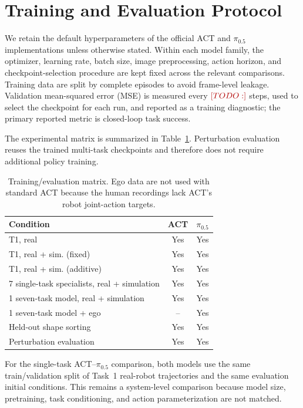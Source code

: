\documentclass[10pt,conference]{IEEEtran}
\newcommand{\TODO}[1]{\textcolor{red!70!black}{[TODO: #1]}}
\begin{document}
\section{Training and Evaluation Protocol}
\label{sec:protocol}

We retain the default hyperparameters of the official ACT and $\pi_{0.5}$
implementations unless otherwise stated. Within each model family, the
optimizer, learning rate, batch size, image preprocessing, action horizon, and
checkpoint-selection procedure are kept fixed across the relevant comparisons.
Training data are split by complete episodes to avoid frame-level leakage.
Validation mean-squared error (MSE) is measured every $\TODO{}$ steps, used to
select the checkpoint for each run, and reported as a training diagnostic; the
primary reported metric is closed-loop task success.

The experimental matrix is summarized in Table~\ref{tab:training-matrix}.
Perturbation evaluation reuses the trained multi-task checkpoints and therefore
does not require additional policy training.

\begin{table}[t]
\centering
\small
\caption{Training/evaluation matrix. Ego data are not used with standard ACT
because the human recordings lack ACT's robot joint-action targets.}
\label{tab:training-matrix}
\begin{tabular}{@{}lcc@{}}
\toprule
Condition & ACT & $\pi_{0.5}$ \\
\midrule
T1, real & Yes & Yes \\
T1, real + sim. (fixed) & Yes & Yes \\
T1, real + sim. (additive) & Yes & Yes \\
7 single-task specialists, real + simulation & Yes & Yes \\
1 seven-task model, real + simulation & Yes & Yes \\
1 seven-task model + ego & -- & Yes \\
Held-out shape sorting & Yes & Yes \\
Perturbation evaluation & Yes & Yes \\
\bottomrule
\end{tabular}
\end{table}

For the single-task ACT--$\pi_{0.5}$ comparison, both models use the same
train/validation split of Task~1 real-robot trajectories and the same evaluation
initial conditions. This remains a system-level comparison because model size,
pretraining, task conditioning, and action parameterization are not matched.
\end{document}
